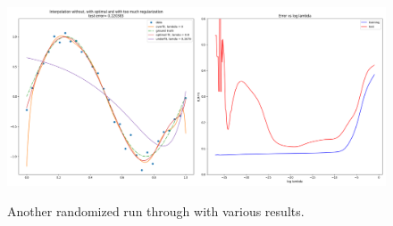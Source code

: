 \documentclass{article}
\begin{document}
	\begin{figure}[h]
		\centering
		\includegraphics[width=\linewidth,height=6.1cm]{plots/full5.png}
		\caption{Another randomized run through with various results.}
		\label{plot:full5}
	\end{figure}
	
	
	
		
		
	
\end{document}
